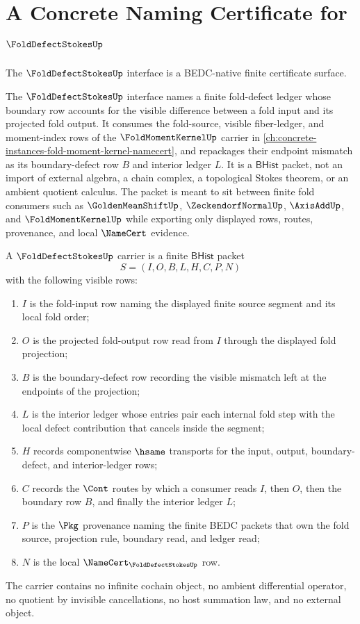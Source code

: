 \chapter{A Concrete Naming Certificate for $\FoldDefectStokesUp$}
\label{ch:concrete-instances-folddefectstokes-namecert}

The $\FoldDefectStokesUp$ interface is a BEDC-native finite certificate surface.

The $\FoldDefectStokesUp$ interface names a finite fold-defect ledger whose boundary row accounts for the visible difference between a fold input and its projected fold output. It consumes the fold-source, visible fiber-ledger, and moment-index rows of the $\FoldMomentKernelUp$ carrier in \autoref{ch:concrete-instances-fold-moment-kernel-namecert}, and repackages their endpoint mismatch as its boundary-defect row $B$ and interior ledger $L$. It is a $\mathsf{BHist}$ packet, not an import of external algebra, a chain complex, a topological Stokes theorem, or an ambient quotient calculus. The packet is meant to sit between finite fold consumers such as $\GoldenMeanShiftUp$, $\ZeckendorfNormalUp$, $\AxisAddUp$, and $\FoldMomentKernelUp$ while exporting only displayed rows, routes, provenance, and local $\NameCert$ evidence.

\begin{definition}
\label{def:fold-defect-stokes-carrier}
A $\FoldDefectStokesUp$ carrier is a finite $\mathsf{BHist}$ packet
$$
S=(I,O,B,L,H,C,P,N)
$$
with the following visible rows:
\begin{enumerate}
\item $I$ is the fold-input row naming the displayed finite source segment and its local fold order;
\item $O$ is the projected fold-output row read from $I$ through the displayed fold projection;
\item $B$ is the boundary-defect row recording the visible mismatch left at the endpoints of the projection;
\item $L$ is the interior ledger whose entries pair each internal fold step with the local defect contribution that cancels inside the segment;
\item $H$ records componentwise $\hsame$ transports for the input, output, boundary-defect, and interior-ledger rows;
\item $C$ records the $\Cont$ routes by which a consumer reads $I$, then $O$, then the boundary row $B$, and finally the interior ledger $L$;
\item $P$ is the $\Pkg$ provenance naming the finite BEDC packets that own the fold source, projection rule, boundary read, and ledger read;
\item $N$ is the local $\NameCert_{\FoldDefectStokesUp}$ row.
\end{enumerate}
The carrier contains no infinite cochain object, no ambient differential operator, no quotient by invisible cancellations, no host summation law, and no external object.
\end{definition}

